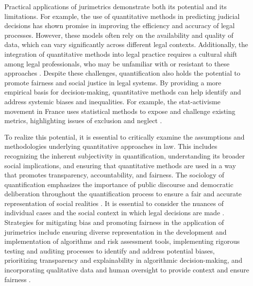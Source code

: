 Practical applications of jurimetrics demonstrate both its potential and its limitations. For example, the use of quantitative methods in predicting judicial decisions has shown promise in improving the efficiency and accuracy of legal processes. However, these models often rely on the availability and quality of data, which can vary significantly across different legal contexts. Additionally, the integration of quantitative methods into legal practice requires a cultural shift among legal professionals, who may be unfamiliar with or resistant to these approaches \cite{l2010de}. Despite these challenges, quantification also holds the potential to promote fairness and social justice in legal systems. By providing a more empirical basis for decision-making, quantitative methods can help identify and address systemic biases and inequalities. For example, the stat-activisme movement in France uses statistical methods to expose and challenge existing metrics, highlighting issues of exclusion and neglect \cite{101057s4159902003965}.

To realize this potential, it is essential to critically examine the assumptions and methodologies underlying quantitative approaches in law. This includes recognizing the inherent subjectivity in quantification, understanding its broader social implications, and ensuring that quantitative methods are used in a way that promotes transparency, accountability, and fairness. The sociology of quantification emphasizes the importance of public discourse and democratic deliberation throughout the quantification process to ensure a fair and accurate representation of social realities \cite{10.1590/dados.2022.65.3.267,10.3390/fi9040068}. It is essential to consider the nuances of individual cases and the social context in which legal decisions are made \cite{10.1007/s11186-021-09453-1,10.3390/fi9040068}. Strategies for mitigating bias and promoting fairness in the application of jurimetrics include ensuring diverse representation in the development and implementation of algorithms and risk assessment tools, implementing rigorous testing and auditing processes to identify and address potential biases, prioritizing transparency and explainability in algorithmic decision-making, and incorporating qualitative data and human oversight to provide context and ensure fairness \cite{10.1007/s11186-021-09453-1,10.3390/fi9040068}.

